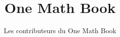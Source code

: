 \documentclass[11pt,a4paper,twoside,openany]{book}
\title{One Math Book}
\author{Les contributeurs du One Math Book}
\date{\bookdate}
\begin{document}
\frontmatter



\tableofcontents

\mainmatter



\appendix
\part{\omsolutionspart}


\backmatter
\printindex
\end{document}
